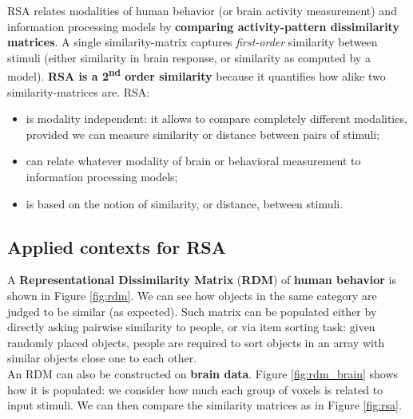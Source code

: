 RSA relates modalities of human behavior (or brain activity measurement) and information processing models by \textbf{comparing activity-pattern dissimilarity matrices}. A single similarity-matrix captures \textit{first-order} similarity between stimuli (either similarity in brain response, or similarity as computed by a  model). \textbf{RSA is a 2\textsuperscript{nd} order similarity} because it quantifies how alike two similarity-matrices are.
RSA:
\begin{itemize}
    \item is modality independent: it allows to compare completely different modalities, provided we can measure similarity or distance between pairs of stimuli;
    \item can relate whatever modality of brain or behavioral  measurement to information processing models;
    \item is based on the notion of similarity, or distance, between stimuli.
\end{itemize}

\subsection{Applied contexts for RSA}

A \textbf{Representational Dissimilarity Matrix} (\textbf{RDM}) of \textbf{human behavior} is shown in Figure \ref{fig:rdm}. We can see how objects in the same category are judged to be similar (as expected). Such matrix can be populated either by directly asking pairwise similarity to people, or via item sorting task: given randomly placed objects, people are required to sort objects in an array with similar objects close one to each other.\\

An RDM can also be constructed on \textbf{brain data}. Figure \ref{fig:rdm_brain} shows how it is populated: we consider how much each group of voxels is related to input stimuli. We can then compare the similarity matrices as in Figure \ref{fig:rsa}.


